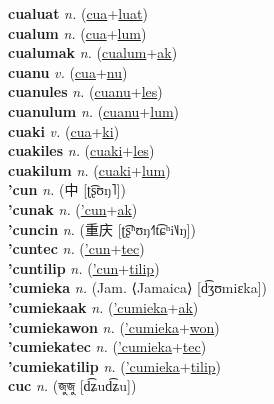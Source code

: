 \textbf{cualuat} \textit{n.} (\hyperref[cua]{cua}+\hyperref[luat]{luat})
 \label{cualuat} \\
\textbf{cualum} \textit{n.} (\hyperref[cua]{cua}+\hyperref[lum]{lum})
 \label{cualum} \\
\textbf{cualumak} \textit{n.} (\hyperref[cualum]{cualum}+\hyperref[ak]{ak})
 \label{cualumak} \\
\textbf{cuanu} \textit{v.} (\hyperref[cua]{cua}+\hyperref[nu]{nu})
 \label{cuanu} \\
\textbf{cuanules} \textit{n.} (\hyperref[cuanu]{cuanu}+\hyperref[les]{les})
 \label{cuanules} \\
\textbf{cuanulum} \textit{n.} (\hyperref[cuanu]{cuanu}+\hyperref[lum]{lum})
 \label{cuanulum} \\
\textbf{cuaki} \textit{v.} (\hyperref[cua]{cua}+\hyperref[ki]{ki})
 \label{cuaki} \\
\textbf{cuakiles} \textit{n.} (\hyperref[cuaki]{cuaki}+\hyperref[les]{les})
 \label{cuakiles} \\
\textbf{cuakilum} \textit{n.} (\hyperref[cuaki]{cuaki}+\hyperref[lum]{lum})
 \label{cuakilum} \\
\textbf{'cun} \textit{n.} ({\chinese{}中} [ʈ͡ʂʊŋ˥])
 \label{'cun} \\
\textbf{'cunak} \textit{n.} (\hyperref['cun]{'cun}+\hyperref[ak]{ak})
 \label{'cunak} \\
\textbf{'cuncin} \textit{n.} ({\chinese{}重庆} [ʈ͡ʂʰʊŋ˧˥t͡ɕʰi˥˩ŋ])
 \label{'cuncin} \\
\textbf{'cuntec} \textit{n.} (\hyperref['cun]{'cun}+\hyperref[tec]{tec})
 \label{'cuntec} \\
\textbf{'cuntilip} \textit{n.} (\hyperref['cun]{'cun}+\hyperref[tilip]{tilip})
 \label{'cuntilip} \\
\textbf{'cumieka} \textit{n.} (Jam. ⟨Jamaica⟩ [d͡ʒʊmiɛka])
 \label{'cumieka} \\
\textbf{'cumiekaak} \textit{n.} (\hyperref['cumieka]{'cumieka}+\hyperref[ak]{ak})
 \label{'cumiekaak} \\
\textbf{'cumiekawon} \textit{n.} (\hyperref['cumieka]{'cumieka}+\hyperref[won]{won})
 \label{'cumiekawon} \\
\textbf{'cumiekatec} \textit{n.} (\hyperref['cumieka]{'cumieka}+\hyperref[tec]{tec})
 \label{'cumiekatec} \\
\textbf{'cumiekatilip} \textit{n.} (\hyperref['cumieka]{'cumieka}+\hyperref[tilip]{tilip})
 \label{'cumiekatilip} \\
\textbf{cuc} \textit{n.} ({\bengali{}জুজু} [d͡ʑud͡ʑu])
